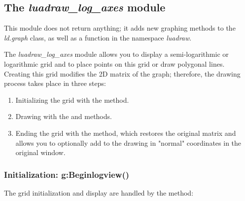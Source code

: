 \subsection{The \emph{luadraw\_log\_axes} module}

This module does not return anything; it adds new graphing methods to the \emph{ld.graph} class, as well as a function in the namespace \emph{luadraw}.

The \emph{luadraw\_log\_axes} module allows you to display a semi-logarithmic or logarithmic grid and to place points on this grid or draw polygonal lines. Creating this grid modifies the 2D matrix of the graph; therefore, the drawing process takes place in three steps:

\begin{enumerate}
    \item Initializing the grid with the  method.
    \item Drawing with the  and  methods.
    \item Ending the grid with the  method, which restores the original matrix and allows you to optionally add to the drawing in "normal" coordinates in the original window.
\end{enumerate}

\subsubsection{Initialization: g:Beginlogview()}

The grid initialization and display are handled by the method:

